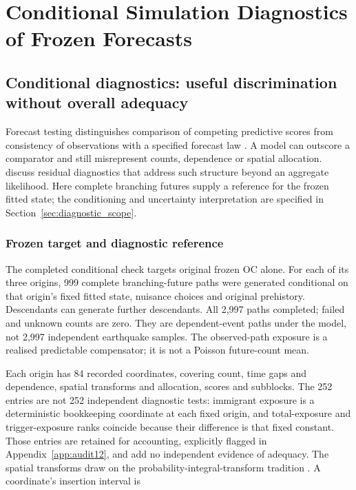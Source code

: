 \chapter{Conditional Simulation Diagnostics of Frozen Forecasts}
\label{ch:calibration}
\section{Conditional diagnostics: useful discrimination without overall adequacy}

Forecast testing distinguishes comparison of competing predictive scores from
consistency of observations with a specified forecast law
\citep{Schorlemmer2007,RhoadesEtAl2011}. A model can outscore a comparator and
still misrepresent counts, dependence or spatial allocation.
\citet{BraySchoenberg2013} discuss residual diagnostics that address such
structure beyond an aggregate likelihood. Here complete branching futures
supply a reference for the frozen fitted state; the conditioning and
uncertainty interpretation are specified in
Section~\ref{sec:diagnostic_scope}.

\subsection{Frozen target and diagnostic reference}

The completed conditional check targets original frozen OC alone. For each of its three origins, 999 complete branching-future paths were generated conditional on that origin's fixed fitted state, nuisance choices and original prehistory. Descendants can generate further descendants. All 2,997 paths completed; failed and unknown counts are zero. They are dependent-event paths under the model, not 2,997 independent earthquake samples. The observed-path exposure is a realised predictable compensator; it is not a Poisson future-count mean.

Each origin has 84 recorded coordinates, covering count, time gaps and dependence, spatial transforms and allocation, scores and subblocks. The 252 entries are not 252 independent diagnostic tests: immigrant exposure is a deterministic bookkeeping coordinate at each fixed origin, and total-exposure and trigger-exposure ranks coincide because their difference is that fixed constant. Those entries are retained for accounting, explicitly flagged in Appendix~\ref{app:audit12}, and add no independent evidence of adequacy. The spatial transforms draw on the probability-integral-transform tradition \citep{Rosenblatt1952,Schoenberg2003}. A coordinate's insertion interval is


